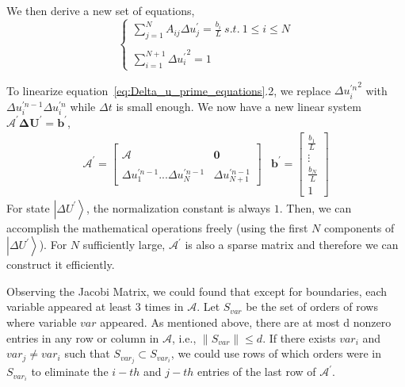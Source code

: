 \documentclass[%
 reprint,
 amsmath,amssymb,
pra,
]{revtex4-1}
\begin{document}
We then derive a new set of equations,
\begin{equation}\label{eq:Delta_u_prime_equations}
\left\{
\begin{array}{l}
  \sum_{j=1}^{N}A_{ij}\Delta u_j^{\prime} = \frac{b_i}{L} \ s.t. \ 1\leq i \leq N\\
  \\
  \sum_{i=1}^{N + 1}{\Delta u_i^{\prime}}^2 = 1
\end{array}
\right.
\end{equation}

To linearize equation~\ref{eq:Delta_u_prime_equations}.2, we replace ${\Delta u^{\prime n}_i}^2$ with $\Delta u^{\prime n - 1}_i \Delta u^{\prime n}_i$ while $\Delta t$ is small enough. We now have a new linear system $\mathcal{A^{\prime}} \bm{\Delta U^{\prime}} = \bm{b^{\prime}}$,
\begin{equation}
\begin{array}{cc}
\mathcal{A^{\prime}} = \left[
\begin{array}{cc}
  &\\
  \mathcal{A} & \bm{0}\\
  &\\
  \Delta u^{\prime n - 1}_1...\Delta u^{\prime n - 1}_N&\Delta u^{\prime n - 1}_{N+1}
\end{array}
\right]
&
\bm{b^{\prime}} = \left[
\begin{array}{c}
  \frac{b_1}{L}\\
  \vdots\\
  \frac{b_N}{L}\\
  1
\end{array}
\right]
\end{array}
\end{equation}
For state $\left|\Delta U^{\prime}\right\rangle$, the normalization constant is always $1$. Then, we can accomplish the mathematical operations freely (using the first $N$ components of $\left|\Delta U^{\prime}\right\rangle$). For $N$ sufficiently large, $\mathcal{A^{\prime}}$ is also a sparse matrix and therefore we can construct it efficiently.


\iffalse
Observing the Jacobi Matrix, we could found that except for boundaries, each variable appeared at least $3$ times in $\mathcal{A}$. Let $S_{var}$ be the set of orders of rows where variable $var$ appeared. As mentioned above, there are at most d nonzero entries in any row or column in $\mathcal{A}$, i.e., $\left\|S_{var}\right\|\leq d$. If there exists $var_i$ and $var_j\neq var_i$ such that $S_{var_j}\subset S_{var_i}$, we could use rows of which orders were in $S_{var_i}$ to eliminate the $i-th$ and $j-th$ entries of the last row of $\mathcal{A^{\prime}}$. 
\end{document}
